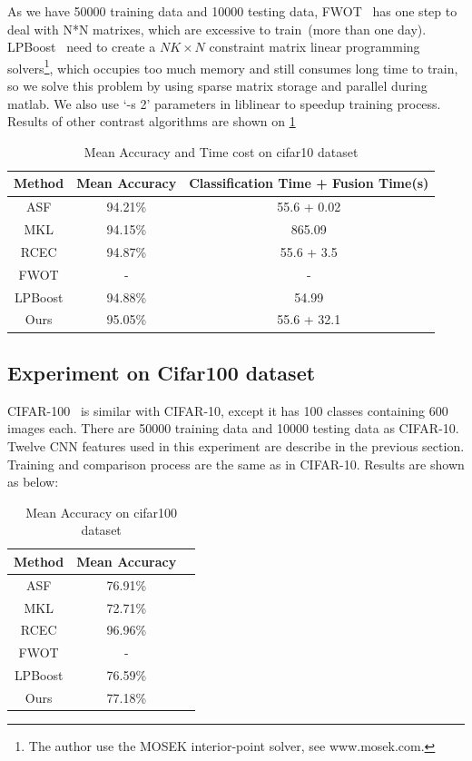 \documentclass[letterpaper]{article}
\begin{document}
As we have 50000 training data and 10000 testing data, FWOT~\cite{xuiccv2013feature} has one step to deal with N*N matrixes, which are excessive to train~(more than one day). LPBoost~\cite{gehler2009feature} need to create a $NK\times N$ constraint matrix linear programming solvers\footnote{The author use the MOSEK interior-point solver, see www.mosek.com.}, which occupies too much memory and still consumes long time to train, so we solve this problem by using sparse matrix storage and parallel during matlab. We also use `-s 2' parameters in liblinear to speedup training process. Results of other contrast algorithms are shown on \ref{table:cifar10}


\begin{table}[h]\scriptsize
\centering
\label{table:cifar10}
\begin{tabular}{c|c|c}
\hline
Method  & Mean Accuracy     & Classification Time + Fusion Time(s)\\\hline
ASF     & 94.21\%           & 55.6 + 0.02                         \\
MKL     & 94.15\%           & 865.09                              \\
RCEC    & 94.87\%           & 55.6 + 3.5                          \\
FWOT    & -                 & -                                   \\
LPBoost & 94.88\%           & 54.99                               \\\hline
Ours    & 95.05\%           & 55.6 + 32.1                         \\
\hline
\end{tabular}
\caption{Mean Accuracy and Time cost on cifar10 dataset}
\end{table}

\subsection{Experiment on Cifar100 dataset}
CIFAR-100~\cite{krizhevsky2009learning} is similar with CIFAR-10, except it has 100 classes containing 600 images each. There are 50000 training data and 10000 testing data as CIFAR-10. Twelve CNN features used in this experiment are describe in the previous section. Training and comparison process are the same as in CIFAR-10. Results are shown as below:


\begin{table}[h]\scriptsize
\centering
\label{table:cifar100}
\begin{tabular}{c|c|c}
\hline
Method  & Mean Accuracy \\\hline
ASF     & 76.91\%           \\
MKL     & 72.71\%           \\
RCEC    & 96.96\%           \\
FWOT    & -                 \\
LPBoost & 76.59\%           \\\hline
Ours    & 77.18\%           \\
\hline
\end{tabular}
\caption{Mean Accuracy on cifar100 dataset}
\end{table}
\end{document}
